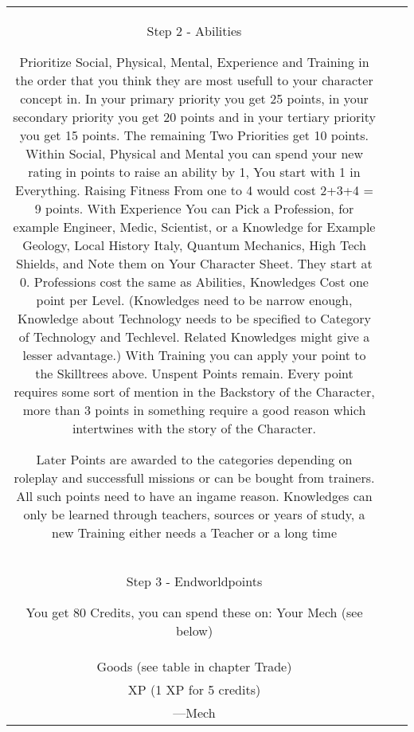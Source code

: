 \documentclass{article}
\newcommand{\subhline}[1]{\begin{center}\large #1 \normalsize \end{center}}
\begin{document}
\begin{tabular}{c|c|c}
    \subhline{Step 2 - Abilities}
    Prioritize Social, Physical, Mental, Experience and Training in the order that you think they are most
    usefull to your character concept in. \newline
    In your primary priority you get 25 points, in your secondary priority you get 20 points and in your tertiary
    priority you get 15 points. The remaining Two Priorities get 10 points.\newline
    Within Social, Physical and Mental you can spend your new rating in points to raise an ability by 1, You start with 1
    in Everything. Raising Fitness From one to 4 would cost 2+3+4 = 9 points.\newline
    With Experience You can Pick a Profession, for example Engineer, Medic, Scientist, or a Knowledge for Example
    Geology, Local History Italy, Quantum Mechanics, High Tech Shields, and Note them on Your Character Sheet. They start at
    0. Professions cost the same as Abilities, Knowledges Cost one point per Level. (Knowledges need to be narrow enough,
    Knowledge about Technology needs to be specified to Category of Technology and Techlevel. Related Knowledges might give
    a lesser advantage.)
    With Training you can apply your point to the Skilltrees above.
    Unspent Points remain. Every point requires some sort of mention in the Backstory of the Character, more than 3 points
    in something require a good reason which intertwines with the story of the Character.

    Later Points are awarded to the categories depending on roleplay and successfull missions or can be bought from
    trainers. All such points need to have an ingame reason. Knowledges can only be learned through teachers, sources or
    years of study, a new Training either needs a Teacher or a long time\\


    \subhline{Step 3 - Endworldpoints}
    You get 80 Credits, you can spend these on:
    Your Mech (see below)\\
    Goods (see table in chapter Trade)\\
    XP (1 XP for 5 credits)\\

    ---Mech\newline


\end{tabular}
\end{document}
